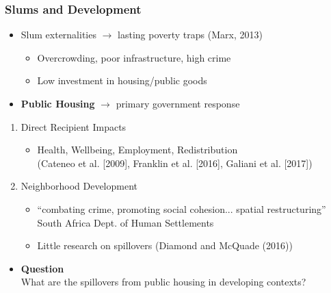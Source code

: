 \documentclass[aspectratio=149]{beamer}
\begin{document}
\begin{frame}
\frametitle{Slums and Development}


\begin{itemize}
  \item Slum externalities $\rightarrow$ lasting poverty traps (Marx, 2013) 
    \begin{itemize}
      \item Overcrowding, poor infrastructure, high crime 
      \item Low investment in housing/public goods
    \end{itemize}  
\vspace{.2cm}
\pause
  \item \textbf{Public Housing} $\rightarrow$ primary government response
\end{itemize}
    \pause
\begin{enumerate}
  \item Direct Recipient Impacts
    \begin{itemize}
      \item Health, Wellbeing, Employment, Redistribution \\ \footnotesize{(Cateneo et al. [2009], Franklin et al. [2016], Galiani et al. [2017])}
    \end{itemize}
    \pause
    \vspace{.1cm}
\item Neighborhood Development
  \begin{itemize}
    \item ``combating crime, promoting social cohesion... spatial restructuring'' South Africa Dept. of Human Settlements
    \pause
    \item Little research on spillovers \footnotesize{(Diamond and McQuade (2016))}
  \end{itemize}
\end{enumerate}

\begin{itemize}
  \item \textbf{Question} \\ 
  \vspace{.1cm}
  What are the spillovers from public housing in developing contexts?
\end{itemize}
\end{frame}
\end{document}
